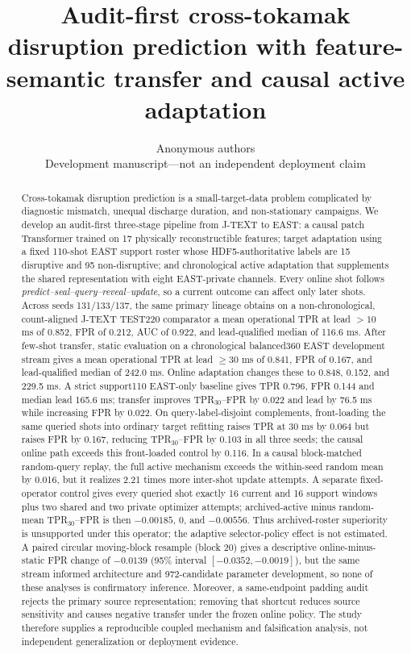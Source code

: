 \documentclass[10pt,twocolumn]{article}
\title{Audit-first cross-tokamak disruption prediction with feature-semantic transfer and causal active adaptation}
\author{Anonymous authors\\[-1mm]\small Development manuscript---not an independent deployment claim}
\date{}
\newcommand{\jtext}{J-TEXT}
\newcommand{\east}{EAST}
\begin{document}
\maketitle

\begin{abstract}
Cross-tokamak disruption prediction is a small-target-data problem complicated by diagnostic mismatch, unequal discharge duration, and non-stationary campaigns.  We develop an audit-first three-stage pipeline from \jtext{} to \east{}: a causal patch Transformer trained on 17 physically reconstructible features; target adaptation using a fixed 110-shot \east{} support roster whose HDF5-authoritative labels are 15 disruptive and 95 non-disruptive; and chronological active adaptation that supplements the shared representation with eight \east{}-private channels.  Every online shot follows \emph{predict--seal--query--reveal--update}, so a current outcome can affect only later shots.  Across seeds 131/133/137, the same primary lineage obtains on a non-chronological, count-aligned \jtext{} TEST220 comparator a mean operational TPR at lead $>10$ ms of 0.852, FPR of 0.212, AUC of 0.922, and lead-qualified median of 116.6 ms.  After few-shot transfer, static evaluation on a chronological balanced360 \east{} development stream gives a mean operational TPR at lead $\geq30$ ms of 0.841, FPR of 0.167, and lead-qualified median of 242.0 ms.  Online adaptation changes these to 0.848, 0.152, and 229.5 ms.  A strict support110 EAST-only baseline gives TPR 0.796, FPR 0.144 and median lead 165.6 ms; transfer improves TPR$_{30}$--FPR by 0.022 and lead by 76.5 ms while increasing FPR by 0.022.  On query-label-disjoint complements, front-loading the same queried shots into ordinary target refitting raises TPR at 30 ms by 0.064 but raises FPR by 0.167, reducing TPR$_{30}$--FPR by 0.103 in all three seeds; the causal online path exceeds this front-loaded control by 0.116.  In a causal block-matched random-query replay, the full active mechanism exceeds the within-seed random mean by 0.016, but it realizes 2.21 times more inter-shot update attempts.  A separate fixed-operator control gives every queried shot exactly 16 current and 16 support windows plus two shared and two private optimizer attempts; archived-active minus random-mean TPR$_{30}$--FPR is then $-0.00185$, 0, and $-0.00556$.  Thus archived-roster superiority is unsupported under this operator; the adaptive selector-policy effect is not estimated.  A paired circular moving-block resample (block 20) gives a descriptive online-minus-static FPR change of $-0.0139$ (95\% interval $[-0.0352,-0.0019]$), but the same stream informed architecture and 972-candidate parameter development, so none of these analyses is confirmatory inference.  Moreover, a same-endpoint padding audit rejects the primary source representation; removing that shortcut reduces source sensitivity and causes negative transfer under the frozen online policy.  The study therefore supplies a reproducible coupled mechanism and falsification analysis, not independent generalization or deployment evidence.
\end{abstract}
\end{document}
